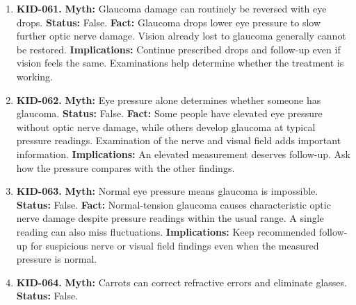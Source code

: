\documentclass[11pt,oneside]{book}
\begin{document}
\begin{enumerate}[leftmargin=0pt,labelwidth=0pt,labelsep=0pt,itemindent=0pt]
\textbf{Status:} False.\newline
\textbf{Fact:} Cataract surgery replaces the cloudy lens with an artificial one. The result depends in part on the retina, optic nerve, and type of implant. Some people still need glasses. \cite{ref175}\newline
\textbf{Implications:} Discuss expected near and distance vision and any other eye disease before choosing an implant.
\item[] \textbf{KID-061.} \textbf{Myth:} Glaucoma damage can routinely be reversed with eye drops.\newline
\textbf{Status:} False.\newline
\textbf{Fact:} Glaucoma drops lower eye pressure to slow further optic nerve damage. Vision already lost to glaucoma generally cannot be restored. \cite{ref174}\newline
\textbf{Implications:} Continue prescribed drops and follow-up even if vision feels the same. Examinations help determine whether the treatment is working.
\item[] \textbf{KID-062.} \textbf{Myth:} Eye pressure alone determines whether someone has glaucoma.\newline
\textbf{Status:} False.\newline
\textbf{Fact:} Some people have elevated eye pressure without optic nerve damage, while others develop glaucoma at typical pressure readings. Examination of the nerve and visual field adds important information. \cite{ref174}\newline
\textbf{Implications:} An elevated measurement deserves follow-up. Ask how the pressure compares with the other findings.
\item[] \textbf{KID-063.} \textbf{Myth:} Normal eye pressure means glaucoma is impossible.\newline
\textbf{Status:} False.\newline
\textbf{Fact:} Normal-tension glaucoma causes characteristic optic nerve damage despite pressure readings within the usual range. A single reading can also miss fluctuations. \cite{ref174}\newline
\textbf{Implications:} Keep recommended follow-up for suspicious nerve or visual field findings even when the measured pressure is normal.
\item[] \textbf{KID-064.} \textbf{Myth:} Carrots can correct refractive errors and eliminate glasses.\newline
\textbf{Status:} False.\newline

\end{enumerate}
\end{document}
